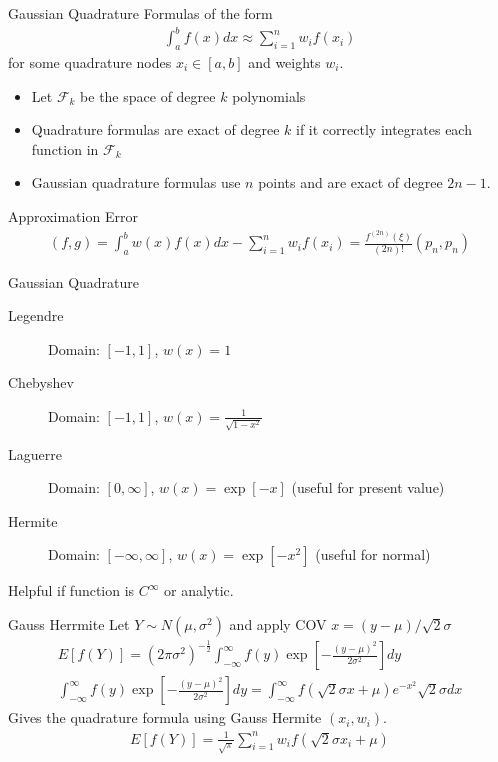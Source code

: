 \documentclass[xcolor=pdftex,dvipsnames,table,mathserif]{beamer}
\begin{document}
\begin{frame}{Gaussian Quadrature}
Formulas of the form
\begin{eqnarray*}
\int_{a}^b f(x) d x \approx \sum_{i=1}^n  w_i f(x_i)
\end{eqnarray*}
for some quadrature nodes $x_i \in [a,b]$ and weights $w_i$.
\begin{itemize}
\item Let $\mathcal{F}_k$ be the space of degree $k$ polynomials
\item Quadrature formulas are exact of degree $k$ if it correctly integrates each function in $\mathcal{F}_k$
\item Gaussian quadrature formulas use $n$ points and are exact of degree $2n-1$.
\end{itemize}
Approximation Error
\begin{eqnarray*}
(f,g) = \int_a^b w(x) f(x)  dx - \sum_{i=1}^n w_i f(x_i) = \frac{f^{(2n)}(\xi)}{(2n)!} (p_n,p_n) 
\end{eqnarray*}
\end{frame}

\begin{frame}{Gaussian Quadrature}
\begin{description}
\item[Legendre] Domain: $[-1,1]$, $w(x) = 1$
\item[Chebyshev] Domain: $[-1,1]$, $w(x) = \frac{1}{\sqrt{1-x^2}}$
\item[Laguerre] Domain: $[0,\infty]$, $w(x) = \exp[-x]$ (useful for present value)
\item[Hermite] Domain: $[-\infty,\infty]$, $w(x) = \exp[-x^2]$ (useful for normal)
\end{description}
Helpful if function is $C^{\infty}$ or analytic.
\end{frame}

\begin{frame}{Gauss Herrmite}
Let $Y\sim N(\mu,\sigma^2)$ and apply COV $x = (y-\mu)/\sqrt{2} \sigma$
\begin{eqnarray*}
E[f(Y)] = (2 \pi \sigma^2)^{-\frac{1}{2}} \int_{-\infty}^{\infty} f(y) \exp\left[-\frac{(y-\mu)^2}{2\sigma^2} \right] dy \\
\int_{-\infty}^{\infty} f(y) \exp\left[-\frac{(y-\mu)^2}{2\sigma^2} \right] dy = \int_{-\infty}^{\infty} f(\sqrt{2} \sigma x + \mu) e^{-x^2} \sqrt{2} \sigma dx
\end{eqnarray*}
Gives the quadrature formula using Gauss Hermite $(x_i,w_i)$.
\begin{eqnarray*}
E[f(Y)] = \frac{1}{\sqrt{\pi}} \sum_{i=1}^n w_i f(\sqrt{2}\sigma x_i + \mu)
\end{eqnarray*}
\end{frame}
\end{document}
